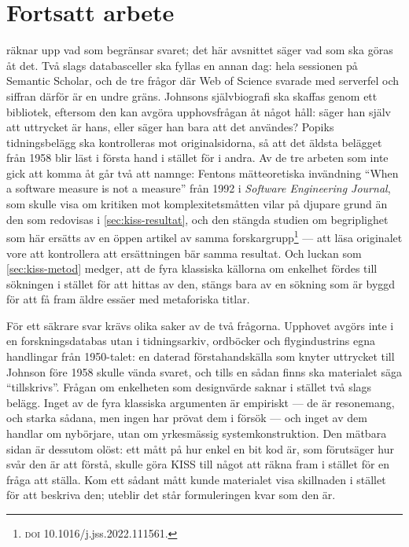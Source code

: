 \section{Fortsatt arbete}
\label{sec:kiss-fortsatt}

 räknar upp vad som begränsar svaret; det här
avsnittet säger vad som ska göras åt det.  Två slags databasceller ska
fyllas en annan dag: hela sessionen på Semantic Scholar, och de tre
frågor där Web of Science svarade med
serverfel och siffran därför är en undre gräns.  Johnsons självbiografi
ska skaffas genom ett bibliotek, eftersom den kan avgöra upphovsfrågan
åt något håll: säger han själv att uttrycket är hans, eller säger han
bara att det användes?  Popiks tidningsbelägg ska kontrolleras mot
originalsidorna, så att det äldsta belägget från 1958 blir läst i första
hand i stället för i andra.  Av de tre arbeten som inte gick att komma
åt går två att namnge: Fentons mätteoretiska invändning \enquote{When a
software measure is not a measure} från 1992 i \emph{Software
Engineering Journal}, som skulle visa om kritiken mot komplexitetsmåtten
vilar på djupare grund än den som redovisas i \cref{sec:kiss-resultat},
och den stängda studien om begriplighet som här ersätts av en öppen
artikel av samma forskargrupp\footnote{\textsc{doi}
  10.1016/j.jss.2022.111561.} --- att läsa originalet vore att
kontrollera att ersättningen bär samma resultat.  Och luckan som
\cref{sec:kiss-metod} medger, att de fyra klassiska källorna om enkelhet
fördes till sökningen i stället för att hittas av den, stängs bara av en
sökning som är byggd för att få fram äldre essäer med metaforiska
titlar.

För ett säkrare svar krävs olika saker av de två frågorna.  Upphovet
avgörs inte i en forskningsdatabas utan i tidningsarkiv, ordböcker och
flygindustrins egna handlingar från 1950-talet: en daterad
förstahandskälla som knyter uttrycket till Johnson före 1958 skulle
vända svaret, och tills en sådan finns ska materialet säga
\enquote{tillskrivs}.  Frågan om enkelheten som designvärde saknar i
stället två slags belägg.  Inget av de fyra klassiska argumenten är
empiriskt --- de är resonemang, och starka sådana, men ingen har prövat
dem i försök --- och inget av dem handlar om nybörjare, utan om
yrkesmässig systemkonstruktion.  Den mätbara sidan är dessutom olöst: ett
mått på hur enkel en bit kod är, som förutsäger hur svår den är att
förstå, skulle göra KISS till något att räkna fram i stället för en
fråga att ställa.  Kom ett sådant mått kunde materialet visa skillnaden
i stället för att beskriva den; uteblir det står formuleringen kvar som
den är.

